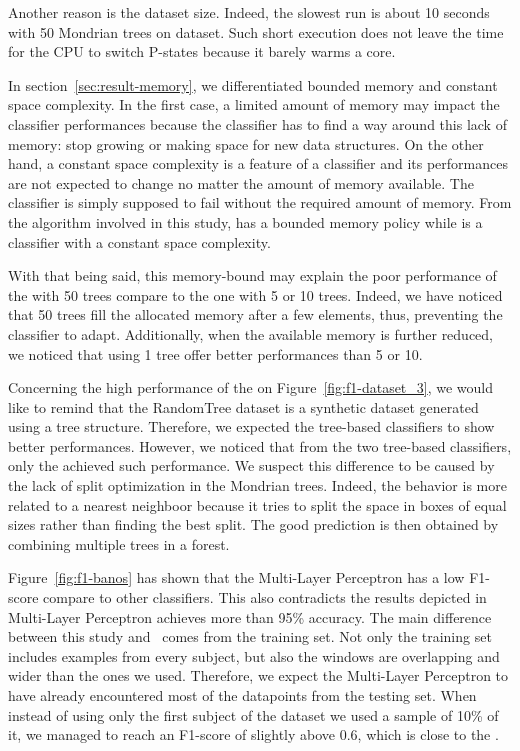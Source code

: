 Another reason is the dataset size. Indeed, the slowest run is about
10 seconds with 50 Mondrian trees on \recofitdataset dataset.  Such short
execution does not leave the time for the CPU to switch P-states because it
barely warms a core.

In section~\ref{sec:result-memory}, we differentiated bounded memory and
constant space complexity. In the first case, a limited amount of memory
may impact the classifier performances because the classifier has to find a way
around this lack of memory: stop growing or making space for new data structures.
On the other hand, a constant space complexity is a feature of a classifier and
its performances are not expected to change no  matter the amount of memory
available. The classifier is simply supposed to fail without the required
amount of memory. From the algorithm involved in this study, \mondrianforest
has a bounded memory policy while \naivebayes is a classifier with a constant
space complexity.

With that being said, this memory-bound may explain the poor performance of the
\mondrianforest with 50 trees compare to the one with 5 or 10 trees. Indeed, we
have noticed that 50 trees fill the allocated memory after a few elements,
thus, preventing the classifier to adapt. Additionally, when the available
memory is further reduced, we noticed that using 1 tree offer better
performances than 5 or 10. 

Concerning the high performance of the \hoeffdingtree on
Figure~\ref{fig:f1-dataset_3}, we would like to remind that the RandomTree
dataset is a synthetic dataset generated using a tree structure. Therefore, we
expected the tree-based classifiers to show better performances.  However, we
noticed that from the two tree-based classifiers, only the \hoeffdingtree
achieved such performance.  We suspect this difference to be caused by the lack
of split optimization in the Mondrian trees. Indeed, the \mondrianforest behavior is
more related to a nearest neighboor because it tries to split the space in
boxes of equal sizes rather than finding the best split. The good prediction is
then obtained by combining multiple trees in a forest.

Figure~\ref{fig:f1-banos} has shown that the Multi-Layer Perceptron has a low
F1-score compare to other classifiers. This also contradicts the results
depicted in~\cite{omid_2019} Multi-Layer Perceptron achieves more than 95\% 
accuracy. The main difference between this study and~\cite{omid_2019} comes
from the training set. Not only the training set includes examples from every
subject, but also the windows are overlapping and wider than the ones we used.
Therefore, we expect the Multi-Layer Perceptron to have already encountered
most of the datapoints from the testing set. When instead of using only the
first subject of the \banosdataset dataset we used a sample of 10\% of it, we
managed to reach an F1-score of slightly above 0.6, which is close to the \naivebayes.

